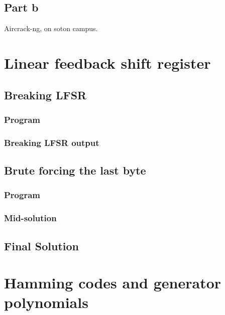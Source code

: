 \documentclass[pdftex, 12pt, a4paper]{article}
\begin{document}
\subsection{Part b}
Aircrack-ng, on soton campus.

\pagebreak
\printbibliography

\pagebreak
\appendices
\section{Linear feedback shift register}
\subsection{Breaking LFSR}
\subsubsection{Program}\label{break-lfsr}

\pagebreak

\subsubsection{Breaking LFSR output}\label{break-lfsr-out}
\pagebreak

\subsection{Brute forcing the last byte}
\subsubsection{Program}\label{last-byte}

\pagebreak

\subsubsection{Mid-solution}\label{last-byte-out}

\subsection{Final Solution}\label{q1-solution}
\pagebreak

\section{Hamming codes and generator polynomials}
\end{document}
